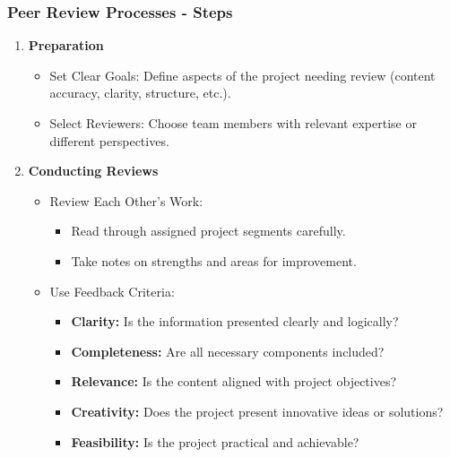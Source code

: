 \documentclass[aspectratio=169]{beamer}
\begin{document}
\begin{frame}[fragile]
    \frametitle{Peer Review Processes - Steps}
    \begin{enumerate}
        \item \textbf{Preparation}
        \begin{itemize}
            \item Set Clear Goals: Define aspects of the project needing review (content accuracy, clarity, structure, etc.).
            \item Select Reviewers: Choose team members with relevant expertise or different perspectives.
        \end{itemize}
        
        \item \textbf{Conducting Reviews}
        \begin{itemize}
            \item Review Each Other’s Work:
            \begin{itemize}
                \item Read through assigned project segments carefully.
                \item Take notes on strengths and areas for improvement.
            \end{itemize}
            \item Use Feedback Criteria:
            \begin{itemize}
                \item \textbf{Clarity:} Is the information presented clearly and logically?
                \item \textbf{Completeness:} Are all necessary components included?
                \item \textbf{Relevance:} Is the content aligned with project objectives?
                \item \textbf{Creativity:} Does the project present innovative ideas or solutions?
                \item \textbf{Feasibility:} Is the project practical and achievable?
            \end{itemize}
        \end{itemize}
    \end{enumerate}
\end{frame}
\end{document}
